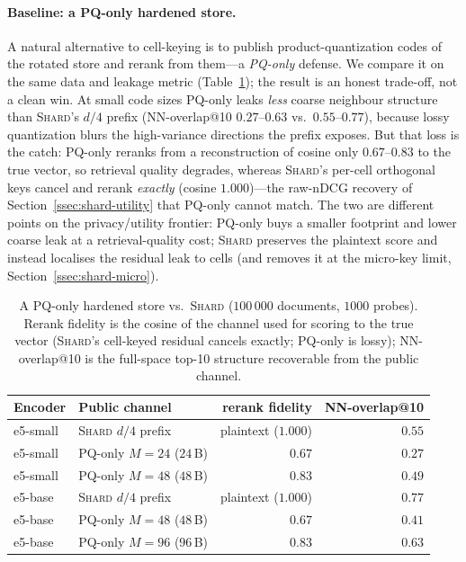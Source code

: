 \documentclass[11pt,a4paper]{article}
\begin{document}
\paragraph{Baseline: a PQ-only hardened store.} A natural alternative to
cell-keying is to publish product-quantization codes of the rotated store
and rerank from them---a \emph{PQ-only} defense. We compare it on the same
data and leakage metric (Table~\ref{tab:shard-pq-only}); the result is an
honest trade-off, not a clean win. At small code sizes PQ-only leaks
\emph{less} coarse neighbour structure than \textsc{Shard}'s $d/4$ prefix
(NN-overlap@10 $0.27$--$0.63$ vs.\ $0.55$--$0.77$), because lossy
quantization blurs the high-variance directions the prefix exposes. But that
loss is the catch: PQ-only reranks from a reconstruction of cosine only
$0.67$--$0.83$ to the true vector, so retrieval quality degrades, whereas
\textsc{Shard}'s per-cell orthogonal keys cancel and rerank \emph{exactly}
(cosine $1.000$)---the raw-nDCG recovery of Section~\ref{ssec:shard-utility}
that PQ-only cannot match. The two are different points on the
privacy/utility frontier: PQ-only buys a smaller footprint and lower coarse
leak at a retrieval-quality cost; \textsc{Shard} preserves the plaintext score
and instead localises the residual leak to cells (and removes it at the
micro-key limit, Section~\ref{ssec:shard-micro}).

\begin{table}[tbp]
\centering
\caption{A PQ-only hardened store vs.\ \textsc{Shard} ($100\,000$ documents,
$1000$ probes). Rerank fidelity is the cosine of the channel used for
scoring to the true vector (\textsc{Shard}'s cell-keyed residual cancels
exactly; PQ-only is lossy); NN-overlap@10 is the full-space top-10 structure
recoverable from the public channel.}
\label{tab:shard-pq-only}
\small
\begin{tabular}{@{}llrr@{}}
\toprule
Encoder & Public channel & rerank fidelity & NN-overlap@10 \\ \midrule
e5-small & \textsc{Shard} $d/4$ prefix & plaintext ($1.000$) & $0.55$ \\
e5-small & PQ-only $M{=}24$ ($24$\,B) & $0.67$ & $0.27$ \\
e5-small & PQ-only $M{=}48$ ($48$\,B) & $0.83$ & $0.49$ \\ \midrule
e5-base & \textsc{Shard} $d/4$ prefix & plaintext ($1.000$) & $0.77$ \\
e5-base & PQ-only $M{=}48$ ($48$\,B) & $0.67$ & $0.41$ \\
e5-base & PQ-only $M{=}96$ ($96$\,B) & $0.83$ & $0.63$ \\
\bottomrule
\end{tabular}
\end{table}
\end{document}

